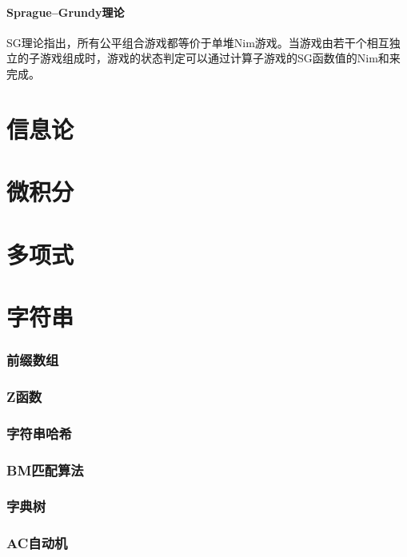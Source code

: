 \documentclass[12pt,a4paper]{article}
\begin{document}
\subsection{Sprague–Grundy理论}
SG理论指出，所有公平组合游戏都等价于单堆Nim游戏。当游戏由若干个相互独立的子游戏组成时，游戏的状态判定可以通过计算子游戏的SG函数值的Nim和来完成。

\newpage
\part{信息论}

\newpage
\part{微积分}

\newpage
\part{多项式}

\newpage
\part{字符串}
\section{前缀数组} %

\newpage
\section{Z函数}

\newpage
\section{字符串哈希}

\newpage
\section{BM匹配算法}

\newpage
\section{字典树} 

\newpage
\section{AC自动机}
\end{document}
